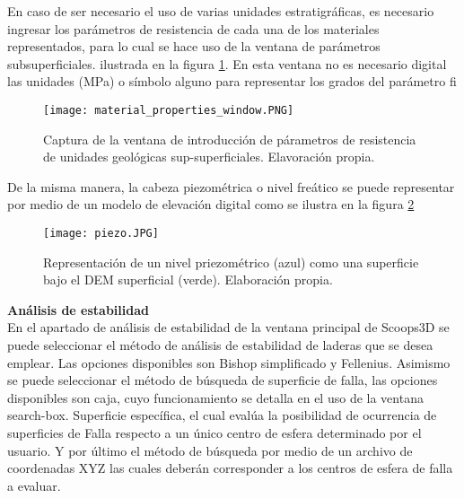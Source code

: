 En caso de ser necesario el uso de varias unidades estratigr\'{a}ficas, es necesario ingresar
los par\'{a}metros de resistencia de cada una de los materiales representados, para lo cual se
hace uso de la ventana de par\'{a}metros subsuperficiales. ilustrada en la figura \ref{fig:parameters}. En esta ventana no es necesario  digital las unidades (MPa) o s\'imbolo alguno para representar los grados del par\'ametro  fi \\

\begin{figure}[H]
\centering
\texttt{[image: material\_properties\_window.PNG]}
\caption{Captura de la ventana de introducci\'on de p\'arametros de resistencia de unidades geol\'ogicas sup-superficiales. Elavoraci\'on propia.}
\label{fig:parameters}
\end{figure}


De la misma manera, la cabeza piezom\'{e}trica o nivel fre\'{a}tico se puede representar por
medio de un modelo de elevaci\'{o}n digital como se ilustra en la figura \ref{modelo piezometrico}
\\


\begin{figure}[H]
\centering
\texttt{[image: piezo.JPG]}
\caption{Representaci\'on de un nivel priezom\'etrico (azul) como una superficie bajo el DEM superficial (verde). Elaboraci\'on propia.}
\label{modelo piezometrico}
\end{figure}

\textbf{An\'{a}lisis de estabilidad}\\
En el apartado de an\'{a}lisis de estabilidad de la ventana principal de Scoops3D se puede
seleccionar el m\'{e}todo de an\'{a}lisis de estabilidad de laderas que se desea emplear. Las
opciones disponibles son Bishop simplificado y Fellenius.
Asimismo se puede seleccionar el m\'{e}todo de b\'{u}squeda de superficie de falla, las opciones
disponibles son caja, cuyo funcionamiento se detalla en el uso de la ventana search-box.
Superficie espec\'{i}fica, el cual eval\'{u}a la posibilidad de ocurrencia de superficies de Falla
respecto a un \'{u}nico centro de esfera determinado por el usuario. Y por \'{u}ltimo el m\'{e}todo de
b\'usqueda por medio de un archivo de coordenadas XYZ las cuales deber\'an corresponder a
los centros de esfera de falla a evaluar.\par

